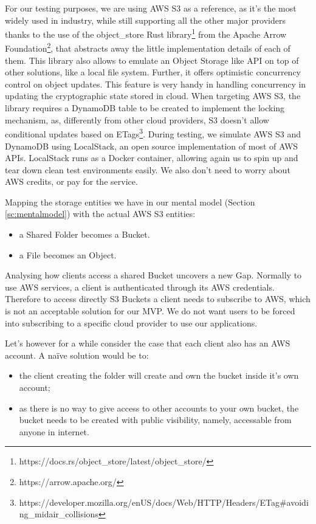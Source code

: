 For our testing purposes, we are using AWS S3 as a reference, as it's the most widely used in industry, 
while still supporting all the other major providers thanks to the use of the object\_store Rust library\footnote{https://docs.rs/object\_store/latest/object\_store/} from the Apache Arrow Foundation\footnote{https://arrow.apache.org/},
that abstracts away the little implementation details of each of them. This library also allows to emulate an Object Storage like API on top of other solutions, like a local file system.
Further, it offers optimistic concurrency control on object updates. 
This feature is very handy in handling concurrency in updating the cryptographic state stored in cloud.
When targeting AWS S3, the library requires a DynamoDB table to be created to implement the locking mechanism, as, differently from other cloud providers, S3 doesn't allow conditional updates based on ETags\footnote{https://developer.mozilla.org/en\-US/docs/Web/HTTP/Headers/ETag\#avoiding\_mid\-air\_collisions}.
During testing, we simulate AWS S3 and DynamoDB using LocalStack, an open source implementation of most of AWS APIs. LocalStack runs as a Docker container, allowing again us to spin up and tear down clean test environments easily.
We also don't need to worry about AWS credits, or pay for the service.

Mapping the storage entities we have in our mental model (Section \cref{sc:mentalmodel}) with the actual AWS S3 entities:
\begin{itemize}
    \item a Shared Folder becomes a Bucket.
    \item a File becomes an Object.
\end{itemize}
Analysing how clients access a shared Bucket uncovers a new Gap.
Normally to use AWS services, a client is authenticated through its AWS credentials.
Therefore to access directly S3 Buckets a client needs to subscribe to AWS, which is not an acceptable solution for our MVP.
We do not want users to be forced into subscribing to a specific cloud provider to use our applications.

Let's however for a while consider the case that each client also has an AWS account.
A na\"ive solution would be to:
\begin{itemize}
    \item the client creating the folder will create and own the bucket inside it's own account;
    \item as there is no way to give access to other accounts to your own bucket, the bucket needs to be created with public visibility, namely, accessable from anyone in internet.
\end{itemize}

